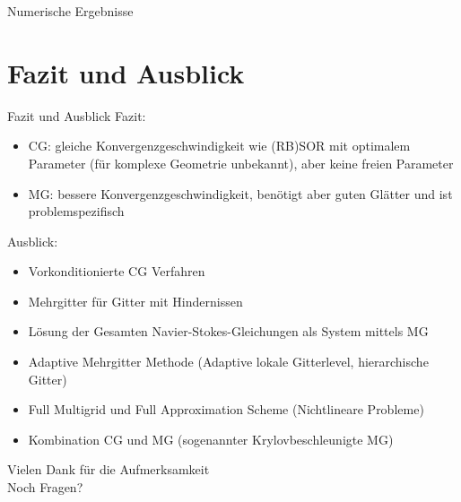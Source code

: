 \documentclass[aspectratio=169]{beamer}
\theoremstyle{thm}
\begin{document}
\begin{frame}{Numerische Ergebnisse}
  \centering
\end{frame}

\section{Fazit und Ausblick}\label{sec:Fazit}
\begin{frame}{Fazit und Ausblick}
  Fazit:
  \begin{itemize}[<+(1)->]
    \item CG: gleiche Konvergenzgeschwindigkeit wie (RB)SOR mit optimalem
        Parameter (für komplexe Geometrie unbekannt), aber keine freien Parameter
    \item MG: bessere Konvergenzgeschwindigkeit, benötigt aber guten Glätter
        und ist problemspezifisch
  \end{itemize}
  Ausblick:
  \begin{itemize}
    \item Vorkonditionierte CG Verfahren
    \item Mehrgitter für Gitter mit Hindernissen
    \item Lösung der Gesamten Navier-Stokes-Gleichungen als System mittels MG
    \item Adaptive Mehrgitter Methode (Adaptive lokale Gitterlevel,
        hierarchische Gitter)
    \item Full Multigrid und Full Approximation Scheme (Nichtlineare Probleme)
    \item Kombination CG und MG (sogenannter Krylovbeschleunigte MG)
  \end{itemize}
\end{frame}

\begin{frame}[plain]
  \begin{center}
    \Large \textcolor{simtechred}{ Vielen Dank für die Aufmerksamkeit } \\[2em]
    \normalsize Noch Fragen?
  \end{center}
\end{frame}
\end{document}
